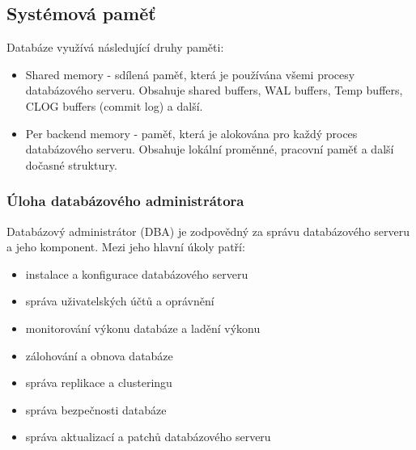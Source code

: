 \subsection*{Systémová paměť}
Databáze využívá následující druhy paměti:
\begin{itemize}
    \item Shared memory - sdílená paměť, která je používána všemi procesy databázového serveru. Obsahuje shared buffers, WAL buffers, Temp buffers, CLOG buffers (commit log) a další.
    \item Per backend memory - paměť, která je alokována pro každý proces databázového serveru. Obsahuje lokální proměnné, pracovní paměť a další dočasné struktury.
\end{itemize}

\subsubsection*{Úloha databázového administrátora}
Databázový administrátor (DBA) je zodpovědný za správu databázového serveru a jeho komponent. Mezi jeho hlavní úkoly patří:
\begin{itemize}
    \item instalace a konfigurace databázového serveru
    \item správa uživatelských účtů a oprávnění
    \item monitorování výkonu databáze a ladění výkonu
    \item zálohování a obnova databáze
    \item správa replikace a clusteringu
    \item správa bezpečnosti databáze
    \item správa aktualizací a patchů databázového serveru
\end{itemize}
